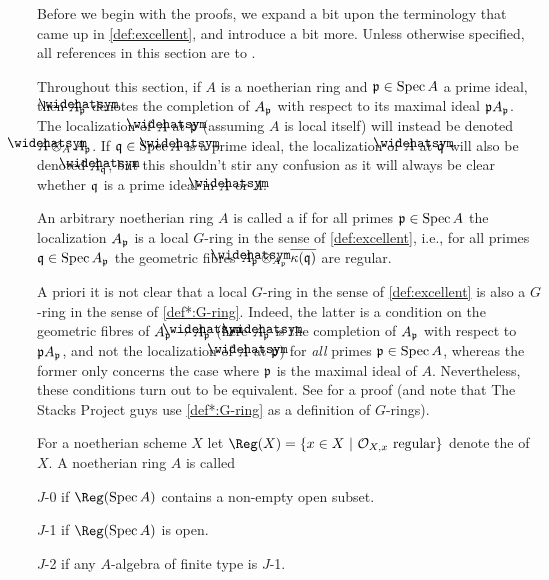 Before we begin with the proofs, we expand a bit upon the terminology that came up in \cref{def:excellent}, and introduce a bit more. Unless otherwise specified, all references in this section are to \cite{stacks-project}.
\begin{nota*}
	Throughout this section, if $A$ is a noetherian ring and $\mathfrak{p}\in\operatorname{Spec} A$ a prime ideal, then $\roof{A}_\pp$ denotes the completion of $A_{\mathfrak{p}}$ with respect to its maximal ideal $\mathfrak{p} A_{\mathfrak{p}}$. The localization of $\roof{A}$ at $\mathfrak{p}$ (assuming $A$ is local itself) will instead be denoted $\roof{A}\otimes_AA_\pp$. If $\qq\in\Spec \roof{A}$ is a prime ideal, the localization of $\roof{A}$ at $\mathfrak{q}$  will also be denoted $\roof{A}_\qq$, but this shouldn't stir any confusion as it will always be clear whether $\mathfrak{q}$ is a prime ideal in $\roof{A}$ or $A$.
\end{nota*}
\begin{defi*}\label{def*:G-ring}
	An arbitrary noetherian ring $A$ is called a  if for all primes $\mathfrak{p}\in\operatorname{Spec} A$ the localization $A_{\mathfrak{p}}$ is a local $G$-ring in the sense of \cref{def:excellent}, i.e., for all primes $\mathfrak{q}\in\operatorname{Spec} A_{\mathfrak{p}}$ the geometric fibres $\roof{A}_\pp\otimes_{A_\pp}\ov{\kappa(\qq)}$ are regular.
\end{defi*}
\begin{rem*}
	A priori it is not clear that a local $G$-ring in the sense of \cref{def:excellent} is also a $G$-ring in the sense of \cref{def*:G-ring}. Indeed, the latter is a condition on the geometric fibres of $A_\pp\morphism \roof{A}_\pp$ (here $\roof{A}_\pp$ is the completion of $A_{\mathfrak{p}}$ with respect to $\mathfrak{p} A_{\mathfrak{p}}$, and not the localization of $\roof{A}$ at $\mathfrak{p}$) for \emph{all} primes $\mathfrak{p}\in\operatorname{Spec} A$, whereas the former only concerns the case where $\mathfrak{p}$ is the maximal ideal of $A$. Nevertheless, these conditions turn out to be equivalent. See  for a proof (and note that The Stacks Project guys use \cref{def*:G-ring} as a definition of $G$-rings).
\end{rem*}
\begin{defi*}
	For a noetherian scheme $X$ let $\Reg(X)=\left\{x\in X\st \Oo_{X,x}\text{ regular}\right\}$ denote the  of $X$. A noetherian ring $A$ is called
	\begin{alphanumerate}
		\item $J$-0 if $\Reg(\Spec A)$ contains a non-empty open subset.
		\item $J$-1 if $\Reg(\Spec A)$ is open.
		\item $J$-2 if any $A$-algebra of finite type is $J$-1.
	\end{alphanumerate}
\end{defi*}

